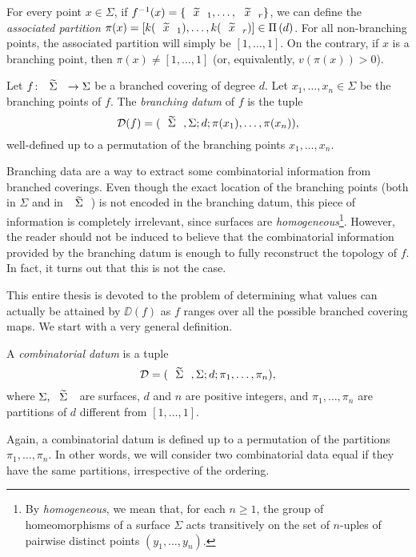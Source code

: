 For every point $x\in\Sigma$, if $f^{-1}(x)=\{\wtilde{x}_1,\ldots,\wtilde{x}_r\}$, we can define the \emph{associated partition} $\pi(x)=[k(\wtilde{x}_1),\ldots,k(\wtilde{x}_r)]\in\Partitions{d}$. For all non-branching points, the associated partition will simply be $[1,\ldots,1]$. On the contrary, if $x$ is a branching point, then $\pi(x)\neq[1,\ldots,1]$ (or, equivalently, $v(\pi(x))>0$).

\begin{definition}
Let $\map{f}{\tSigma}{\Sigma}$ be a branched covering of degree $d$. Let $x_1,\ldots,x_n\in\Sigma$ be the branching points of $f$. The \emph{branching datum} of $f$ is the tuple
\[
\DD(f)=\datum{\tSigma,\Sigma}{d}{\pi(x_1),\ldots,\pi(x_n)},
\]
well-defined up to a permutation of the branching points $x_1,\ldots,x_n$.
\end{definition}

Branching data are a way to extract some combinatorial information from branched coverings. Even though the exact location of the branching points (both in $\Sigma$ and in $\tSigma$) is not encoded in the branching datum, this piece of information is completely irrelevant, since surfaces are \emph{homogeneous}\footnote{By \emph{homogeneous}, we mean that, for each $n\ge 1$, the group of homeomorphisms of a surface $\Sigma$ acts transitively on the set of $n$-uples of pairwise distinct points $(y_1,\ldots,y_n)$.}. However, the reader should not be induced to believe that the combinatorial information provided by the branching datum is enough to fully reconstruct the topology of $f$. In fact, it turns out that this is not the case.

This entire thesis is devoted to the problem of determining what values can actually be attained by $\DD(f)$ as $f$ ranges over all the possible branched covering maps. We start with a very general definition.

\begin{definition}
A \emph{combinatorial datum} is a tuple
\[
\DD=\datum{\tSigma,\Sigma}{d}{\pi_1,\ldots,\pi_n},
\]
where $\Sigma,\tSigma$ are surfaces, $d$ and $n$ are positive integers, and $\pi_1,\ldots,\pi_n$ are partitions of $d$ different from $[1,\ldots,1]$.
\end{definition}

Again, a combinatorial datum is defined up to a permutation of the partitions $\pi_1,\ldots,\pi_n$. In other words, we will consider two combinatorial data equal if they have the same partitions, irrespective of the ordering.

